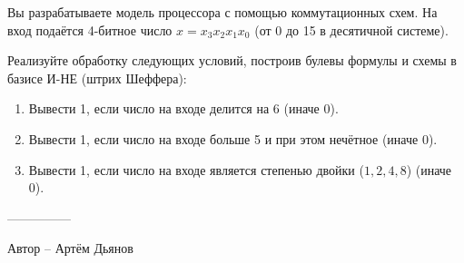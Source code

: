 \question
Вы разрабатываете модель процессора с помощью коммутационных схем. На вход подаётся 4-битное число $x=x_3x_2x_1x_0$ (от 0 до 15 в десятичной системе).

Реализуйте обработку следующих условий, построив булевы формулы и схемы в базисе И-НЕ (штрих Шеффера):
\begin{enumerate}
\item Вывести 1, если число на входе делится на 6 (иначе 0).
\item Вывести 1, если число на входе больше 5 и при этом нечётное (иначе 0).
\item Вывести 1, если число на входе является степенью двойки ($1,2,4,8$) (иначе 0).
\end{enumerate}

---------------

Автор -- Артём Дьянов
